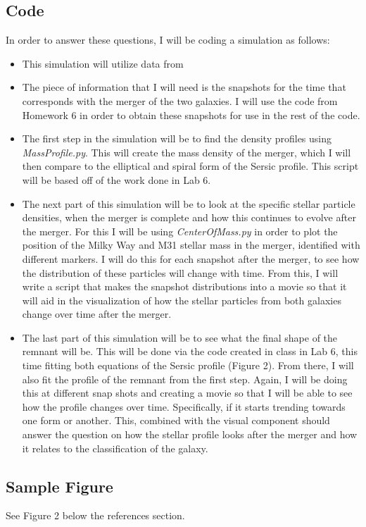 \documentclass[twocolumn]{aastex63}
\begin{document}
\subsection{Code}
In order to answer these questions, I will be coding a simulation as follows:
\begin{itemize}
 \item This simulation will utilize data from \cite{2012ApJ...753....9V}
 \item The piece of information that I will need is the snapshots for the time that corresponds with the merger of the two galaxies. I will use the code from Homework 6 in order to obtain these snapshots for use in the rest of the code. 
 \item The first step in the simulation will be to find the density profiles using \textit{MassProfile.py}. This will create the mass density of the merger, which I will then compare to the elliptical and spiral form of the Sersic profile. This script will be based off of the work done in Lab 6. 
 \item The next part of this simulation will be to look at the specific stellar particle densities, when the merger is complete and how this continues to evolve after the merger. For this I will be using \textit{CenterOfMass.py} in order to plot the position of the Milky Way and M31 stellar mass in the merger, identified with different markers. I will do this for each snapshot after the merger, to see how the distribution of these particles will change with time. From this, I will write a script that makes the snapshot distributions into a movie so that it will aid in the visualization of how the stellar particles from both galaxies change over time after the merger.
 \item The last part of this simulation will be to see what the final shape of the remnant will be. This will be done via the code created in class in Lab 6, this time fitting both equations of the Sersic profile (Figure 2). From there, I will also fit the profile of the remnant from the first step. Again, I will be doing this at different snap shots and creating a movie so that I will be able to see how the profile changes over time. Specifically, if it starts trending towards one form or another. This, combined with the visual component should answer the question on how the stellar profile looks after the merger and how it relates to the classification of the galaxy. 
\end{itemize}

\subsection{Sample Figure}
See Figure 2 below the references section.
\end{document}
